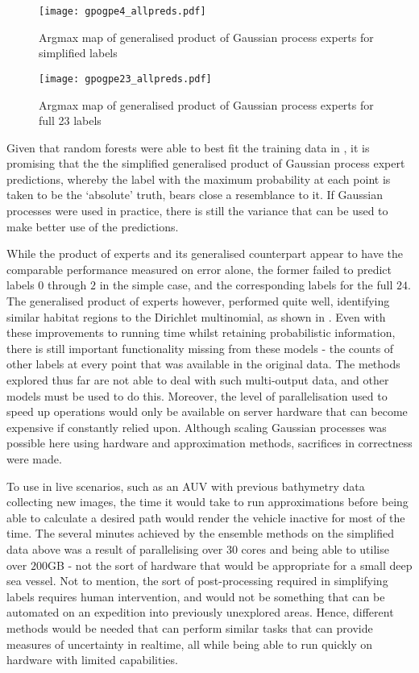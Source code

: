 \begin{figure}
    \texttt{[image: gpogpe4\_allpreds.pdf]}
    \caption{Argmax map of generalised product of Gaussian process experts for simplified labels}
    \label{fig:gpogpe4}
\end{figure}

\begin{figure}
    \texttt{[image: gpogpe23\_allpreds.pdf]}
    \caption{Argmax map of generalised product of Gaussian process experts for full 23 labels }
    \label{fig:gpogpe23}
\end{figure}

Given that random forests were able to best fit the training data in , it is promising that the the simplified generalised product of Gaussian process expert predictions, whereby the label with the maximum probability at each point is taken to be the `absolute' truth, bears close a resemblance to it. If Gaussian processes were used in practice, there is still the variance that can be used to make better use of the predictions. 

While the product of experts and its generalised counterpart appear to have the comparable performance measured on error alone, the former failed to predict labels $0$ through $2$ in the simple case, and the corresponding labels for the full $24$. The generalised product of experts however, performed quite well, identifying similar habitat regions to the Dirichlet multinomial, as shown in . Even with these improvements to running time whilst retaining probabilistic information, there is still important functionality missing from these models - the counts of other labels at every point that was available in the original data. The methods explored thus far are not able to deal with such multi-output data, and other models must be used to do this. Moreover, the level of parallelisation used to speed up operations would only be available on server hardware that can become expensive if constantly relied upon. Although scaling Gaussian processes was possible here using hardware and approximation methods, sacrifices in correctness were made. 

To use in live scenarios, such as an AUV with previous bathymetry data collecting new images, the time it would take to run approximations before being able to calculate a desired path would render the vehicle inactive for most of the time. The several minutes achieved by the ensemble methods on the simplified data above was a result of parallelising over $30$ cores and being able to utilise over $200$GB - not the sort of hardware that would be appropriate for a small deep sea vessel. Not to mention, the sort of post-processing required in simplifying labels requires human intervention, and would not be something that can be automated on an expedition into previously unexplored areas. Hence, different methods would be needed that can perform similar tasks that can provide measures of uncertainty in realtime, all while being able to run quickly on hardware with limited capabilities.

\pagebreak
